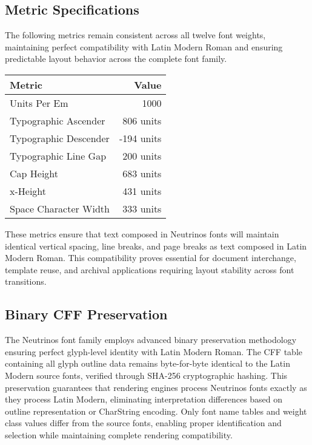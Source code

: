 \documentclass[11pt,letterpaper]{article}
\begin{document}
\subsection{Metric Specifications}

The following metrics remain consistent across all twelve font weights, maintaining perfect compatibility with Latin Modern Roman and ensuring predictable layout behavior across the complete font family.

\begin{center}
\begin{tabular}{lr}
\toprule
\textbf{Metric} & \textbf{Value} \\
\midrule
Units Per Em & 1000 \\
Typographic Ascender & 806 units \\
Typographic Descender & -194 units \\
Typographic Line Gap & 200 units \\
Cap Height & 683 units \\
x-Height & 431 units \\
Space Character Width & 333 units \\
\bottomrule
\end{tabular}
\end{center}

These metrics ensure that text composed in Neutrinos fonts will maintain identical vertical spacing, line breaks, and page breaks as text composed in Latin Modern Roman. This compatibility proves essential for document interchange, template reuse, and archival applications requiring layout stability across font transitions.

\subsection{Binary CFF Preservation}

The Neutrinos font family employs advanced binary preservation methodology ensuring perfect glyph-level identity with Latin Modern Roman. The CFF table containing all glyph outline data remains byte-for-byte identical to the Latin Modern source fonts, verified through SHA-256 cryptographic hashing. This preservation guarantees that rendering engines process Neutrinos fonts exactly as they process Latin Modern, eliminating interpretation differences based on outline representation or CharString encoding. Only font name tables and weight class values differ from the source fonts, enabling proper identification and selection while maintaining complete rendering compatibility.
\end{document}
